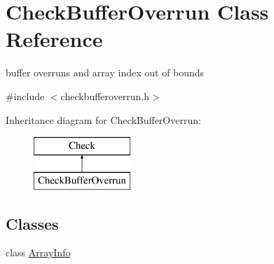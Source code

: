 \hypertarget{class_check_buffer_overrun}{\section{Check\-Buffer\-Overrun Class Reference}
\label{class_check_buffer_overrun}
}


buffer overruns and array index out of bounds  




{\ttfamily \#include $<$checkbufferoverrun.\-h$>$}

Inheritance diagram for Check\-Buffer\-Overrun\-:\begin{figure}[H]
\begin{center}
\leavevmode
\includegraphics[height=2.000000cm]{class_check_buffer_overrun}
\end{center}
\end{figure}
\subsection*{Classes}
\begin{DoxyCompactItemize}
\item 
class \hyperlink{class_check_buffer_overrun_1_1_array_info}{Array\-Info}
\end{DoxyCompactItemize}
